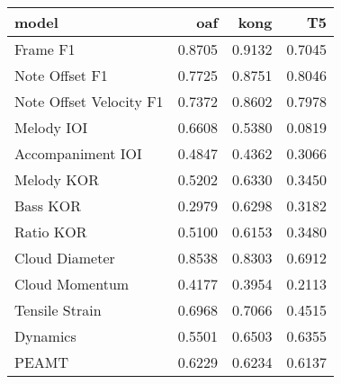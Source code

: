 \begin{tabular}{lrrr}
\toprule
model & oaf & kong & T5 \\
\midrule
Frame F1 & 0.8705 & 0.9132 & 0.7045 \\
Note Offset F1 & 0.7725 & 0.8751 & 0.8046 \\
Note Offset Velocity F1 & 0.7372 & 0.8602 & 0.7978 \\
Melody IOI & 0.6608 & 0.5380 & 0.0819 \\
Accompaniment IOI & 0.4847 & 0.4362 & 0.3066 \\
Melody KOR & 0.5202 & 0.6330 & 0.3450 \\
Bass KOR & 0.2979 & 0.6298 & 0.3182 \\
Ratio KOR & 0.5100 & 0.6153 & 0.3480 \\
Cloud Diameter & 0.8538 & 0.8303 & 0.6912 \\
Cloud Momentum & 0.4177 & 0.3954 & 0.2113 \\
Tensile Strain & 0.6968 & 0.7066 & 0.4515 \\
Dynamics & 0.5501 & 0.6503 & 0.6355 \\
PEAMT & 0.6229 & 0.6234 & 0.6137 \\
\bottomrule
\end{tabular}
